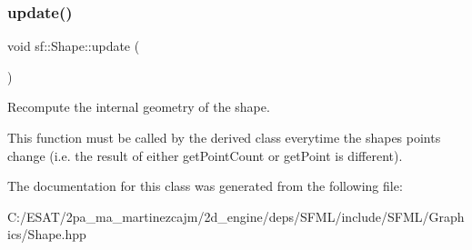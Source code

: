 \subsubsection{\texorpdfstring{update()}{update()}}
{\footnotesize\ttfamily void sf\+::\+Shape\+::update (\begin{DoxyParamCaption}{ }\end{DoxyParamCaption})\hspace{0.3cm}{\ttfamily [protected]}}



Recompute the internal geometry of the shape. 

This function must be called by the derived class everytime the shape\textquotesingle{}s points change (i.\+e. the result of either get\+Point\+Count or get\+Point is different). 

The documentation for this class was generated from the following file\+:\begin{DoxyCompactItemize}
\item 
C\+:/\+E\+S\+A\+T/2pa\+\_\+ma\+\_\+martinezcajm/2d\+\_\+engine/deps/\+S\+F\+M\+L/include/\+S\+F\+M\+L/\+Graphics/Shape.\+hpp\end{DoxyCompactItemize}
